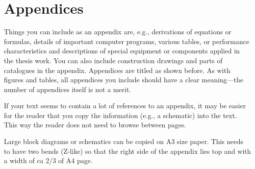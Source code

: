 \section{Appendices}
\label{sec:appendices}

Things you can include as an appendix are, e.g., derivations of equations or formulas, details of important computer programs, various tables, or performance characteristics and descriptions of special equipment or components applied in the thesis work. You can also include construction drawings and parts of catalogues in the appendix. Appendices are titled as shown before. As with figures and tables, all appendices you include should have a clear meaning---the number of appendices itself is not a merit.

If your text seems to contain a lot of references to an appendix, it may be easier for the reader that you copy the information (e.g., a schematic) into the text. This way the reader does not need to browse between pages.

Large block diagrams or schematics can be copied on A3 size paper. This needs to have two bends (Z-like) so that the right side of the appendix lies top and with a width of ca 2/3 of A4 page.
